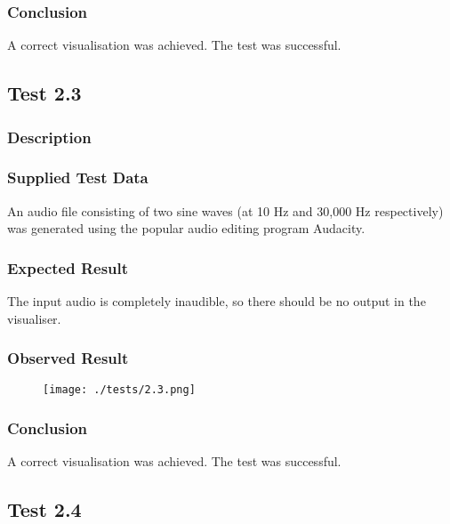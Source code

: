 \subsubsection{Conclusion}
A correct visualisation was achieved. The test was successful.

\pagebreak
\subsection{Test 2.3}
\subsubsection{Description}
\paragraph{}
{
	\centering
}

\subsubsection{Supplied Test Data}
An audio file consisting of two sine waves (at 10 Hz and 30,000 Hz respectively) was generated using the popular audio editing program Audacity.

\subsubsection{Expected Result}
The input audio is completely inaudible, so there should be no output in the visualiser.

\subsubsection{Observed Result}
\label{sec:evidence2.3}
\begin{figure}[H]
	\texttt{[image: ./tests/2.3.png]}
\end{figure}

\subsubsection{Conclusion}
A correct visualisation was achieved. The test was successful.

\pagebreak
\subsection{Test 2.4}

